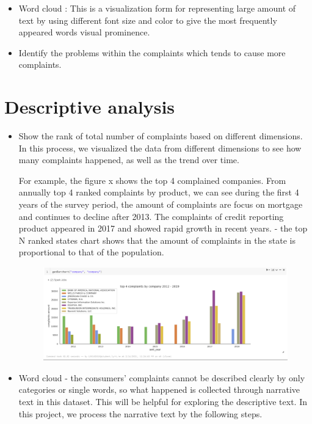 \documentclass[conference]{IEEEtran}
\begin{document}
\begin{itemize}

\item Word cloud : This is a visualization form for representing large amount of text by using different font size and color to give the most frequently appeared words visual prominence.
\item Identify the problems within the complaints which tends to cause more complaints.
\end{itemize}

\section{Descriptive analysis }

\begin{itemize}
\item Show the rank of total number of complaints based on different dimensions. 
In this process, we visualized the data from different dimensions to see how many complaints happened, as well as the trend over time.

For example, the figure x shows the top 4 complained companies. 
From annually top 4 ranked complaints  by product, we can see
during the first 4 years of the survey period, the amount of complaints are focus on mortgage and continues to decline after 2013. The complaints of credit reporting product appeared in 2017 and showed rapid growth in recent years.
- the top N ranked states chart shows that the amount of complaints in the state is proportional to that of the population.


	\begin{figure}[h]
		\centering
		\includegraphics[width=1\linewidth]{img/bycompany.png}
	\end{figure} 






\item Word cloud - the consumers' complaints cannot be described clearly by only categories or single words, so what happened is collected through narrative text in this dataset. This will be helpful for exploring the descriptive text. In this project, we process the narrative text by the following steps.


\end{itemize}
\end{document}
